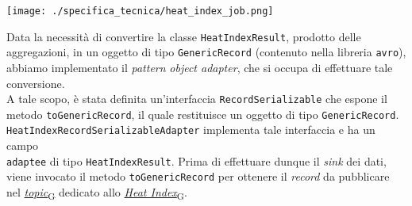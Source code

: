 \begin{center}
	\texttt{[image: ./specifica\_tecnica/heat\_index\_job.png]}
\end{center}

\label{object_adapter}
Data la necessità di convertire la classe \texttt{HeatIndexResult}, prodotto delle aggregazioni, in un oggetto di tipo \texttt{GenericRecord} (contenuto nella libreria \texttt{avro}),
abbiamo implementato il \textit{pattern} \textit{object adapter}, che si occupa di effettuare tale conversione.\\
A tale scopo, è stata definita un'interfaccia \texttt{RecordSerializable} che espone il metodo \texttt{toGenericRecord}, il quale restituisce un oggetto di tipo \texttt{GenericRecord}.\\
\texttt{HeatIndexRecordSerializableAdapter} implementa tale interfaccia e ha un campo \\\texttt{adaptee} di tipo \texttt{HeatIndexResult}. Prima di effettuare dunque il \textit{sink}
dei dati, viene invocato il metodo \texttt{toGenericRecord} per ottenere il \textit{record} da pubblicare nel \href{https://7last.github.io/docs/pb/documentazione-interna/glossario\#topic}{\textit{topic}\textsubscript{G}} dedicato allo \href{https://7last.github.io/docs/pb/documentazione-interna/glossario\#heat-index}{\textit{Heat Index}\textsubscript{G}}.

